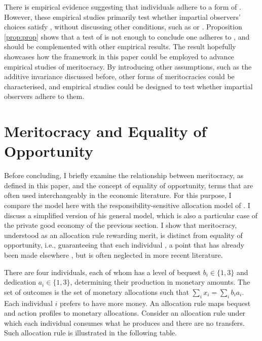 There is empirical evidence suggesting that individuals adhere to a form of  \citep{andreShallowMeritocracy2024,cappelenFairnessLimitedInformation2024}. However, these empirical studies primarily test whether impartial observers' choices satisfy , without discussing other conditions, such as  or . Proposition \ref{prop:prop} shows that a test of  is not enough to conclude one adheres to , and should be complemented with other empirical results. The result hopefully showcases how the framework in this paper could be employed to advance empirical studies of meritocracy. By introducing other assumptions, such as the additive invariance discussed before, other forms of meritocracies could be characterised, and empirical studies could be designed to test whether impartial observers adhere to them.

\section{Meritocracy and Equality of Opportunity}\label{sec:eq}

Before concluding, I briefly examine the relationship between meritocracy, as defined in this paper, and the concept of equality of opportunity, terms that are often used interchangeably in the economic literature. For this purpose, I compare the model here with the responsibility-sensitive allocation model of \cite{fleurbaeyFairnessResponsibilityWelfare2008}. I discuss a simplified version of his general model, which is also a particular case of the private good economy of the previous section. I show that meritocracy, understood as an allocation rule rewarding merit, is distinct from equality of opportunity, i.e., guaranteeing that each individual , a point that has already been made elsewhere \citep{moulinFairDivisionCollective2004,fleurbaeyFairnessResponsibilityWelfare2008}, but is often neglected in more recent literature.

There are four individuals, each of whom has a level of bequest \( b_i \in \{1, 3 \} \) and dedication \( a_i \in \{ 1, 3 \} \), determining their production in monetary amounts. The set of outcomes is the set of monetary allocations such that \( \sum_i x_i = \sum_i b_i a_i \). Each individual \( i \) prefers to have more money. An allocation rule maps bequest and action profiles to monetary allocations. Consider an allocation rule under which each individual consumes what he produces and there are no transfers. Such allocation rule is illustrated in the following table.

